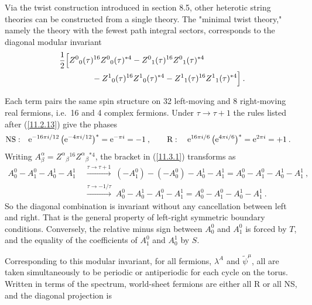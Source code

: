 Via the twist construction introduced in section 8.5, other heterotic string theories can be constructed from a single theory. The "minimal twist theory," namely the theory with the fewest path integral sectors, corresponds to the diagonal modular invariant
\begin{align}
	&\frac{1}{2}\Bigl[
	Z^{0}{}_{0}(\tau)^{16}Z^{0}{}_{0}(\tau)^{\ast 4}- Z^{0}{}_{1}(\tau)^{16}Z^{0}{}_{1}(\tau)^{\ast 4} \nonumber \\
	&\qquad \qquad - Z^{1}{}_{0}(\tau)^{16}Z^{1}{}_{0}(\tau)^{\ast 4}-Z^{1}{}_{1}(\tau)^{16}Z^{1}{}_{1}(\tau)^{\ast 4}
	\Bigr]  \:. \label{11.3.1}
\end{align}
\begin{tcolorbox}[breakable]
	\begin{remark}
		Each term pairs the same spin structure on 32 left-moving and 8 right-moving real fermions, i.e.\ 16 and 4 complex fermions. Under $\tau\to\tau+1$ the rules listed after (\ref{11.2.13}) give the phases
		\begin{align*}
			\text{NS}:&\quad \mathrm{e}^{-16\pi i/12}\,\bigl(\mathrm{e}^{-4\pi i/12}\bigr)^{\ast}=\mathrm{e}^{-\pi i}=-1\:,\qquad
			\text{R}:\quad \mathrm{e}^{16\pi i/6}\,\bigl(\mathrm{e}^{4\pi i/6}\bigr)^{\ast}=\mathrm{e}^{2\pi i}=+1\:.
		\end{align*}
		Writing $A_{\beta}^{\alpha}=Z^{\alpha}{}_{\beta}{}^{16}Z^{\alpha}{}_{\beta}{}^{\ast4}$, the bracket in (\ref{11.3.1}) transforms as
		\begin{align*}
			A^{0}_{0}-A^{0}_{1}-A^{1}_{0}-A^{1}_{1}
			\;&\xrightarrow{\tau\to\tau+1}\;(-A^{0}_{1})-(-A^{0}_{0})-A^{1}_{0}-A^{1}_{1}=A^{0}_{0}-A^{0}_{1}-A^{1}_{0}-A^{1}_{1}\:,\\
			\;&\xrightarrow{\tau\to-1/\tau}\;A^{0}_{0}-A^{1}_{0}-A^{0}_{1}-A^{1}_{1}=A^{0}_{0}-A^{0}_{1}-A^{1}_{0}-A^{1}_{1}\:.
		\end{align*}
		So the diagonal combination is invariant without any cancellation between left and right. That is the general property of left-right symmetric boundary conditions. Conversely, the relative minus sign between $A^{0}_{0}$ and $A^{0}_{1}$ is forced by $T$, and the equality of the coefficients of $A^{0}_{1}$ and $A^{1}_{0}$ by $S$.
	\end{remark}
\end{tcolorbox}
Corresponding to this modular invariant, for all fermions, $\lambda^{A}$ and $\tilde{\psi}^{\mu}$, all are taken simultaneously to be periodic or antiperiodic for each cycle on the torus. Written in terms of the spectrum, world-sheet fermions are either all R or all NS, and the diagonal projection is

